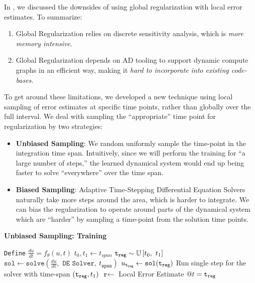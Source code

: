In , we discussed the downsides of using global regularization with local error estimates. To summarize:
%
\begin{enumerate}
  \item Global Regularization relies on discrete sensitivity analysis, which is \textit{more memory intensive}.

  \item Global Regularization depends on AD tooling to support dynamic compute graphs in an efficient way, making it \textit{hard to incorporate into existing code-bases}.
\end{enumerate}
%
To get around these limitations, we developed a new technique using local sampling of error estimates at specific time points, rather than globally over the full interval. We deal with sampling the ``appropriate'' time point for regularization by two strategies:
%
\begin{itemize}
  \item \textbf{ Unbiased Sampling}: We random uniformly sample the time-point in the integration time span. Intuitively, since we will perform the training for ``a large number of steps,'' the learned dynamical system would end up being faster to solve ``everywhere'' over the time span.

  \item \textbf{ Biased Sampling}: Adaptive Time-Stepping Differential Equation Solvers naturally take more steps around the area, which is harder to integrate. We can bias the regularization to operate around parts of the dynamical system which are ``harder'' by sampling a time-point from the solution time points.
\end{itemize}
%

\begin{algorithm}[t]
  \caption{\textbf{Unbiased Sampling: Training}}
  \label{alg:local_regularization_unbiased_sampling}
  \begin{algorithmic}[1]
    \State \texttt{Define} $\frac{du}{dt} = f_\theta(u, t)$
    \State $t_0, t_1 \gets t_{span}$
    \State $\texttt{t}_{\texttt{reg}} \sim \mathbb{U}\left[t_0,~t_1\right]$
    \State $\texttt{sol} \gets \texttt{solve}(\frac{du}{dt}, \texttt{ DE Solver},~t_{\texttt{span}})$
    \State $u_{\texttt{t}_{\texttt{reg}}} \gets \texttt{sol}(\texttt{t}_{\texttt{reg}})$
    \State Run single step for the solver with time-span $(\texttt{t}_{\texttt{reg}}, t_1)$
    \State $\texttt{r} \gets $ Local Error Estimate $@ t=\texttt{t}_{\texttt{reg}}$
    \State {}
    \EndFunction
  \end{algorithmic}
\end{algorithm}

